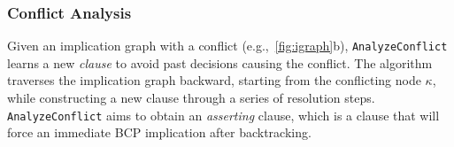 \documentclass[oneside,11pt,dvipsnames]{book}
\numberwithin{equation}{section}
\theoremstyle{definition}
\theoremstyle{remark}
\begin{document}




\subsubsection{Conflict Analysis}\label{sec:analyze-conflicts}

Given an implication graph with a conflict (e.g.,~\autoref{fig:igraph}b), \texttt{AnalyzeConflict} learns a new \emph{clause} to avoid past decisions causing the conflict.
The algorithm traverses the implication graph backward, starting from the conflicting node $\kappa$, while constructing a new clause through a series of resolution steps.
\texttt{AnalyzeConflict} aims to obtain an \emph{asserting} clause, which is a clause that will force an immediate BCP implication after backtracking.
\end{document}

